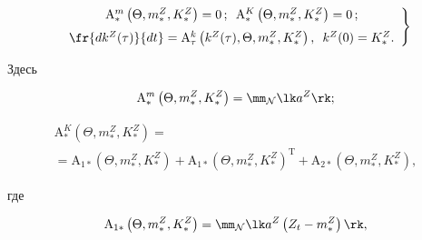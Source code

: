    \begin{equation}

   \left.

   \begin{array}{c}

    \mathrm{A}_*^m \left(\Theta, m_*^Z, K_*^Z\right)=0\,;\enskip \mathrm{A}_*^K \left(\Theta, m_*^Z,  K_*^Z\right) =0\,;

   \\[6pt]

    \fr{dk^Z(\tau)}{dt} = \mathrm{A}_\tau^k \left(k^Z(\tau),\Theta, m_*^Z, K_*^Z\right), 

\enskip k^Z (0) = K_*^Z.

\end{array}

\right\}

\label{e3.9-s}

\end{equation}

Здесь

\begin{equation}

    \mathrm{A}_*^m\left(\Theta, m_*^Z, K_*^Z\right)=\mm_{\mathcal{N}} \lk a^Z\rk;

    \label{e51a}

\end{equation}



\vspace*{-12pt}



\noindent

\begin{multline}

    \mathrm{A}_*^K \left(\Theta, m_*^Z, K_*^Z\right)={}\\

    {}= \mathrm{A}_{1*} \left(\Theta, m_*^Z,  K_*^Z\right)+\mathrm{A}_{1*} 

    \left(\Theta, m_*^Z, K_*^Z\right)^{\mathrm{T}} + \mathrm{A}_{2*} \left(\Theta, m_*^Z,  K_*^Z\right),

    \label{e51b}

   \end{multline}

    где

    $$

    \mathrm{A}_{1*} \left(\Theta, m_*^Z, K_*^Z\right)= \mm_{\mathcal{N}} \lk a^Z \left(Z_t - m_*^Z\right)\rk,

    $$

